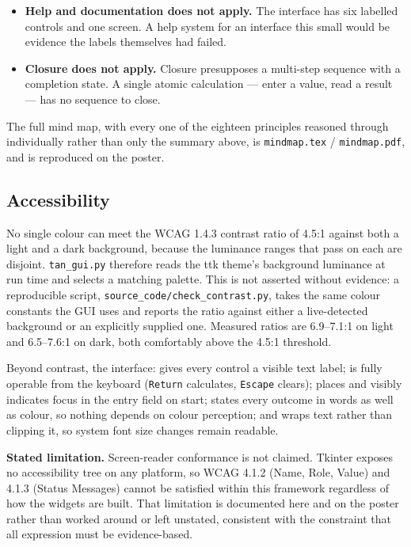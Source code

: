 \documentclass[11pt,a4paper]{article}
\begin{document}
\begin{itemize}
  \item \textbf{Help and documentation does not apply.} The interface
        has six labelled controls and one screen. A help system for
        an interface this small would be evidence the labels
        themselves had failed.
  \item \textbf{Closure does not apply.} Closure presupposes a
        multi-step sequence with a completion state. A single
        atomic calculation --- enter a value, read a result --- has
        no sequence to close.
\end{itemize}

\noindent The full mind map, with every one of the eighteen
principles reasoned through individually rather than only the
summary above, is \texttt{mindmap.tex} / \texttt{mindmap.pdf}, and is
reproduced on the poster.

\subsection{Accessibility}

No single colour can meet the WCAG 1.4.3 contrast ratio of 4.5:1
against both a light and a dark background, because the luminance
ranges that pass on each are disjoint. \texttt{tan\_gui.py} therefore
reads the ttk theme's background luminance at run time and selects a
matching palette. This is not asserted without evidence: a
reproducible script, \texttt{source\_code/check\_contrast.py}, takes
the same colour constants the GUI uses and reports the ratio against
either a live-detected background or an explicitly supplied one.
Measured ratios are 6.9--7.1:1 on light and 6.5--7.6:1 on dark, both
comfortably above the 4.5:1 threshold.

\noindent Beyond contrast, the interface: gives every control a
visible text label; is fully operable from the keyboard
(\texttt{Return} calculates, \texttt{Escape} clears); places and
visibly indicates focus in the entry field on start; states every
outcome in words as well as colour, so nothing depends on colour
perception; and wraps text rather than clipping it, so system font
size changes remain readable.

\noindent\textbf{Stated limitation.} Screen-reader conformance is
not claimed. Tkinter exposes no accessibility tree on any platform,
so WCAG 4.1.2 (Name, Role, Value) and 4.1.3 (Status Messages) cannot
be satisfied within this framework regardless of how the widgets are
built. That limitation is documented here and on the poster rather
than worked around or left unstated, consistent with the constraint
that all expression must be evidence-based.
\end{document}
